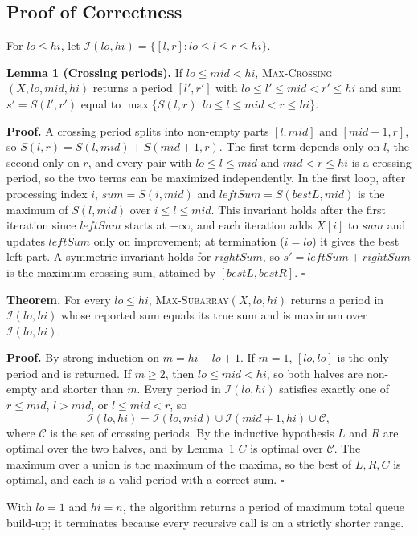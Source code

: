 \subsection{Proof of Correctness}

For $\mathit{lo} \le \mathit{hi}$, let
$\mathcal{I}(\mathit{lo}, \mathit{hi}) = \{[l, r] : \mathit{lo} \le l \le r \le \mathit{hi}\}$.

\medskip
\noindent\textbf{Lemma 1 (Crossing periods).}
If $\mathit{lo} \le \mathit{mid} < \mathit{hi}$,
\textsc{Max-Crossing}$(X, \mathit{lo}, \mathit{mid}, \mathit{hi})$
returns a period $[l', r']$ with
$\mathit{lo} \le l' \le \mathit{mid} < r' \le \mathit{hi}$
and sum $s' = S(l', r')$ equal to
$\max \{ S(l, r) : \mathit{lo} \le l \le \mathit{mid} < r \le \mathit{hi} \}$.

\noindent\textbf{Proof.}
A crossing period splits into non-empty parts
$[l, \mathit{mid}]$ and $[\mathit{mid}+1, r]$, so
$S(l, r) = S(l, \mathit{mid}) + S(\mathit{mid}+1, r)$.
The first term depends only on $l$, the second only on
$r$, and every pair with $\mathit{lo} \le l \le \mathit{mid}$
and $\mathit{mid} < r \le \mathit{hi}$ is a crossing
period, so the two terms can be maximized independently.
In the first loop, after processing index $i$,
$\mathit{sum} = S(i, \mathit{mid})$ and
$\mathit{leftSum} = S(\mathit{bestL}, \mathit{mid})$ is the
maximum of $S(l, \mathit{mid})$ over
$i \le l \le \mathit{mid}$. This invariant holds after
the first iteration since $\mathit{leftSum}$ starts at
$-\infty$, and each iteration adds $X[i]$ to
$\mathit{sum}$ and updates $\mathit{leftSum}$ only on
improvement; at termination ($i = \mathit{lo}$) it gives
the best left part. A symmetric invariant holds for
$\mathit{rightSum}$, so
$s' = \mathit{leftSum} + \mathit{rightSum}$ is the
maximum crossing sum, attained by
$[\mathit{bestL}, \mathit{bestR}]$. \hfill $\square$

\medskip
\noindent\textbf{Theorem.}
For every $\mathit{lo} \le \mathit{hi}$,
\textsc{Max-Subarray}$(X, \mathit{lo}, \mathit{hi})$
returns a period in $\mathcal{I}(\mathit{lo}, \mathit{hi})$
whose reported sum equals its true sum and is maximum
over $\mathcal{I}(\mathit{lo}, \mathit{hi})$.

\noindent\textbf{Proof.}
By strong induction on $m = \mathit{hi} - \mathit{lo} + 1$.
If $m = 1$, $[\mathit{lo}, \mathit{lo}]$ is the only
period and is returned. If $m \ge 2$, then
$\mathit{lo} \le \mathit{mid} < \mathit{hi}$, so both
halves are non-empty and shorter than $m$. Every period
in $\mathcal{I}(\mathit{lo}, \mathit{hi})$ satisfies
exactly one of $r \le \mathit{mid}$, $l > \mathit{mid}$,
or $l \le \mathit{mid} < r$, so
\[
\mathcal{I}(\mathit{lo}, \mathit{hi}) =
\mathcal{I}(\mathit{lo}, \mathit{mid}) \cup
\mathcal{I}(\mathit{mid}+1, \mathit{hi}) \cup \mathcal{C},
\]
where $\mathcal{C}$ is the set of crossing periods. By
the inductive hypothesis $L$ and $R$ are optimal over
the two halves, and by Lemma~1 $C$ is optimal over
$\mathcal{C}$. The maximum over a union is the maximum
of the maxima, so the best of $L, R, C$ is optimal, and
each is a valid period with a correct sum.
\hfill $\square$

\medskip
With $\mathit{lo} = 1$ and $\mathit{hi} = n$, the
algorithm returns a period of maximum total queue
build-up; it terminates because every recursive call is
on a strictly shorter range.
